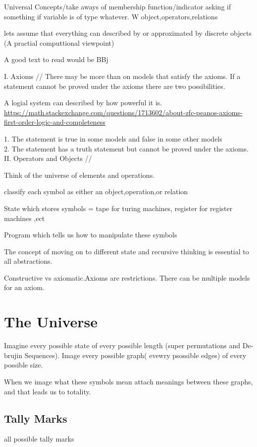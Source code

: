 \documentclass{book}
\begin{document}
Universal Concepts/take aways of membership function/indicator
asking if something if variable is of type whatever.
W
object,operators,relations

lets assume that everything can described by or approximated by discrete objects (A practial computtional viewpoint)


A good text to read would be BBj \cite{DUMMY:1}

I. Axioms // 
There may be more than on models that satisfy the axioms. 
If a statement cannot be proved under the axioms there are two possibilities. 

A logial system can described by how powerful it is.  
\url{https://math.stackexchange.com/questions/1713602/about-zfc-peanos-axioms-first-order-logic-and-completeness}

1. The statement is true in some models and false in some other models \\ 
2. The statement has a truth statement but cannot be proved under the axioms.  \\

II. Operators  and Objects //


Think of the universe of elements and operations. 


classify each symbol as either an object,operation,or relation


State which stores symbols = tape for turing machines, register for register machines ,ect

Program which tells us how to manipulate these symbols

The concept of moving on to  different state and recursive thinking is essential to all abstractions.


Constructive vs axiomatic.Axioms are restrictions. There can be multiple models for an axiom. 



\chapter{The Universe}
Imagine every possible state of every possible length (super permutations and De-brujin Sequences). 
Image every possible graph( evewry psossible edges) of every possible size.

When we image what these symbols mean attach meanings between these graphs, and that leads us to totality.

\section{Tally Marks}
all possible tally marks
\end{document}
